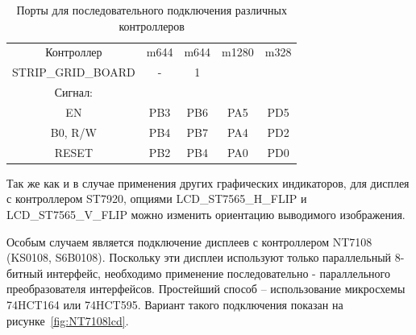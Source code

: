 \begin{table}[H]
  \begin{center}
    \begin{tabular}{| c || c | c | c | c |}
    \hline
 Контроллер  & m644  & m644 & m1280  & m328 \\
STRIP\_GRID\_BOARD &   -   &   1   &        &     \\
Сигнал:     &       &       &        &         \\
    \hline
    \hline
  EN        &  PB3  & PB6   &  PA5   & PD5     \\
    \hline
  B0, R/W   &  PB4  & PB7   &  PA4   & PD2      \\
    \hline
  RESET     &  PB2  & PB4   &  PA0   & PD0      \\
    \hline
    \end{tabular}
  \end{center}
  \caption{Порты для последовательного подключения различных контроллеров}
  \label{tab:ser-processor}
\end{table}

Так же как и в случае применения других графических индикаторов, для дисплея с контроллером ST7920,
опциями LCD\_ST7565\_H\_FLIP и LCD\_ST7565\_V\_FLIP можно изменить ориентацию выводимого изображения.

Особым случаем является подключение дисплеев с контроллером NT7108 (KS0108, S6B0108). Поскольку эти дисплеи 
используют только параллельный 8-битный интерфейс, необходимо применение последовательно - параллельного 
преобразователя интерфейсов. Простейший способ -- использование микросхемы 74HCT164 или 74HCT595.
Вариант такого подключения показан на рисунке~\ref{fig:NT7108lcd}.

